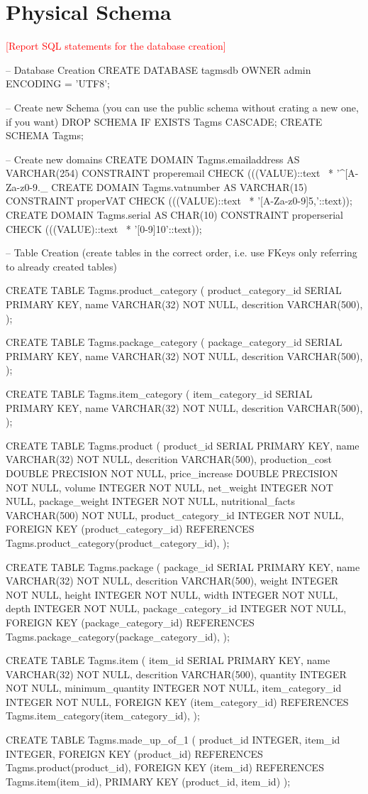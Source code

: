\section{Physical Schema}
\textcolor{red}{[Report SQL statements for the database creation]}

-- Database Creation
CREATE DATABASE tagmsdb OWNER admin ENCODING = 'UTF8';

-- Create new Schema (you can use the public schema without crating a new one, if you want)
DROP SCHEMA IF EXISTS Tagms CASCADE;
CREATE SCHEMA Tagms;

-- Create new domains
CREATE DOMAIN Tagms.emailaddress AS VARCHAR(254)
CONSTRAINT properemail CHECK (((VALUE)::text ~* '^[A-Za-z0-9._%
CREATE DOMAIN Tagms.vatnumber AS VARCHAR(15)
CONSTRAINT properVAT CHECK (((VALUE)::text ~* '[A-Za-z0-9]{5,}'::text));
CREATE DOMAIN Tagms.serial AS CHAR(10)
CONSTRAINT properserial CHECK (((VALUE)::text ~* '[0-9]{10}'::text));

-- Table Creation (create tables in the correct order, i.e. use FKeys only referring to already created tables)

CREATE TABLE Tagms.product_category (
product_category_id SERIAL PRIMARY KEY,
name VARCHAR(32) NOT NULL,
descrition VARCHAR(500),
);

CREATE TABLE Tagms.package_category (
package_category_id SERIAL PRIMARY KEY,
name VARCHAR(32) NOT NULL,
descrition VARCHAR(500),
);

CREATE TABLE Tagms.item_category (
item_category_id SERIAL PRIMARY KEY,
name VARCHAR(32) NOT NULL,
descrition VARCHAR(500),
);

CREATE TABLE Tagms.product (
product_id SERIAL PRIMARY KEY,
name VARCHAR(32) NOT NULL,
descrition VARCHAR(500),
production_cost DOUBLE PRECISION NOT NULL,
price_increase DOUBLE PRECISION NOT NULL,
volume INTEGER NOT NULL,
net_weight INTEGER NOT NULL,
package_weight INTEGER NOT NULL,
nutritional_facts VARCHAR(500) NOT NULL,
product_category_id INTEGER NOT NULL,
FOREIGN KEY (product_category_id) REFERENCES Tagms.product_category(product_category_id),
);

CREATE TABLE Tagms.package (
package_id SERIAL PRIMARY KEY,
name VARCHAR(32) NOT NULL,
descrition VARCHAR(500),
weight INTEGER NOT NULL,
height INTEGER NOT NULL,
width INTEGER NOT NULL,
depth INTEGER NOT NULL,
package_category_id INTEGER NOT NULL,
FOREIGN KEY (package_category_id) REFERENCES Tagms.package_category(package_category_id),
);

CREATE TABLE Tagms.item (
item_id SERIAL PRIMARY KEY,
name VARCHAR(32) NOT NULL,
descrition VARCHAR(500),
quantity INTEGER NOT NULL,
minimum_quantity INTEGER NOT NULL,
item_category_id INTEGER NOT NULL,
FOREIGN KEY (item_category_id) REFERENCES Tagms.item_category(item_category_id),
);

CREATE TABLE Tagms.made_up_of_1 (
product_id INTEGER,
item_id INTEGER,
FOREIGN KEY (product_id) REFERENCES Tagms.product(product_id),
FOREIGN KEY (item_id) REFERENCES Tagms.item(item_id),
PRIMARY KEY (product_id, item_id)
);